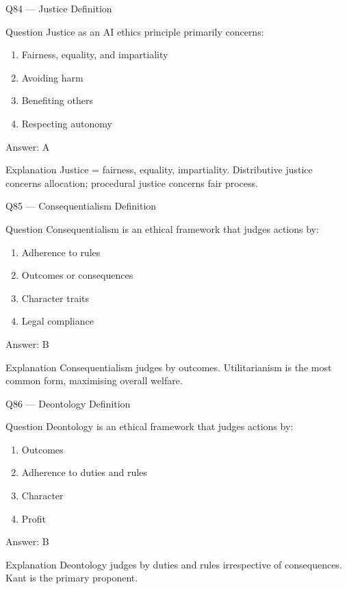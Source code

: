 \documentclass[aspectratio=169,8pt]{beamer}
\begin{document}
	\begin{frame}{Q84 --- Justice Definition}
		\begin{block}{Question}
			Justice as an AI ethics principle primarily concerns:
			\begin{enumerate}
				\item Fairness, equality, and impartiality
				\item Avoiding harm
				\item Benefiting others
				\item Respecting autonomy
			\end{enumerate}
		\end{block}
		\begin{exampleblock}{Answer: A}\end{exampleblock}
		\begin{block}{Explanation}
			Justice = fairness, equality, impartiality. Distributive justice concerns allocation; procedural justice concerns fair process.
		\end{block}
	\end{frame}
	
	\begin{frame}{Q85 --- Consequentialism Definition}
		\begin{block}{Question}
			Consequentialism is an ethical framework that judges actions by:
			\begin{enumerate}
				\item Adherence to rules
				\item Outcomes or consequences
				\item Character traits
				\item Legal compliance
			\end{enumerate}
		\end{block}
		\begin{exampleblock}{Answer: B}\end{exampleblock}
		\begin{block}{Explanation}
			Consequentialism judges by outcomes. Utilitarianism is the most common form, maximising overall welfare.
		\end{block}
	\end{frame}
	
	\begin{frame}{Q86 --- Deontology Definition}
		\begin{block}{Question}
			Deontology is an ethical framework that judges actions by:
			\begin{enumerate}
				\item Outcomes
				\item Adherence to duties and rules
				\item Character
				\item Profit
			\end{enumerate}
		\end{block}
		\begin{exampleblock}{Answer: B}\end{exampleblock}
		\begin{block}{Explanation}
			Deontology judges by duties and rules irrespective of consequences. Kant is the primary proponent.
		\end{block}
	\end{frame}
	
\end{document}
